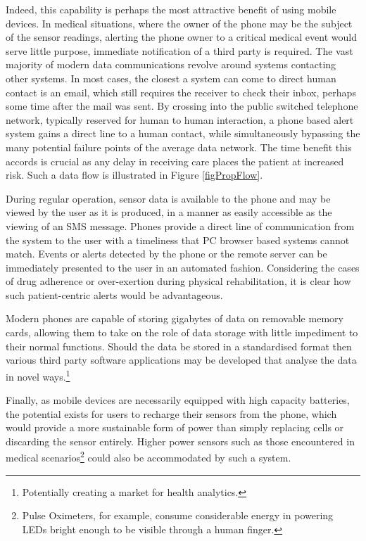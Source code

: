 \documentclass[conference,a4paper]{IEEEtran}
\begin{document}
Indeed, this capability is perhaps the most attractive benefit of using mobile devices.
In medical situations, where the owner of the phone may be the subject of the sensor readings, alerting the phone owner to a critical medical event would serve little purpose, immediate notification of a third party is required.
The vast majority of modern data communications revolve around systems contacting other systems. In most cases, the closest a system can come to direct human contact is an email, which still requires the receiver to check their inbox, perhaps some time after the mail was sent.
By crossing into the public switched telephone network, typically reserved for human to human interaction, a phone based alert system gains a direct line to a human contact, while simultaneously bypassing the many potential failure points of the average data network.
The time benefit this accords is crucial as any delay in receiving care places the patient at increased risk. Such a data flow is illustrated in Figure \ref{figPropFlow}.

During regular operation, sensor data is available to the phone and may be viewed by the user as it is produced, in a manner as easily accessible as the viewing  of an SMS message. Phones provide a direct line of communication from the system to the user with a timeliness that PC browser based systems cannot match. Events or alerts detected by the phone or the remote server can be immediately presented to the user in an automated fashion. Considering the cases of drug adherence or over-exertion during physical rehabilitation, it is clear how such patient-centric alerts would be advantageous.

Modern phones are capable of storing gigabytes of data on removable memory cards, allowing them to take on the role of data storage with little impediment to their normal functions.
Should the data be stored in a standardised format then various third party software applications may be developed that analyse the data in novel ways.\footnote{Potentially creating a market for health analytics.}

Finally, as mobile devices are necessarily equipped with high capacity batteries, the potential exists for users to recharge their sensors from the phone, which would provide a more sustainable form of power than simply replacing cells or discarding the sensor entirely.
Higher power sensors such as those encountered in medical scenarios\footnote{Pulse Oximeters, for example, consume considerable energy in powering LEDs bright enough to be visible through a human finger.} could also be accommodated by such a system.
\end{document}
